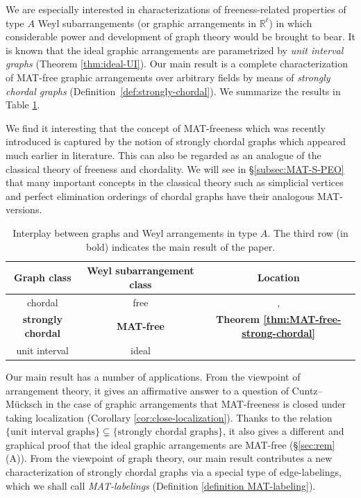 \documentclass[ALCO, Unicode,published]{cedram}
\newcommand{\R}{\mathbb{R}}
\begin{document}
We are especially interested in characterizations of freeness-related properties of type $A$ Weyl subarrangements (or graphic arrangements in $\R^\ell$) in which considerable power and development of graph theory would be brought to bear.
It is known that the ideal graphic arrangements are parametrized by \emph{unit interval graphs} \eg  \cite{TT21}
(\cf Theorem  \ref{thm:ideal-UI}). 
Our main result is a complete characterization of MAT-free graphic arrangements over arbitrary fields by means of  \emph{strongly chordal graphs} (\cf Definition~\ref{def:strongly-chordal}). 
We summarize the results in Table \ref{tab:concepts}. 

We find it interesting that the concept of MAT-freeness which was recently introduced is captured by the notion of strongly chordal graphs which appeared  much earlier in literature.
This can also be regarded as an analogue of the  classical theory of freeness and chordality. 
We will see in \S \ref{subsec:MAT-S-PEO} that many important concepts in the classical theory such as simplicial vertices and perfect elimination orderings of chordal graphs have their analogous MAT- versions. 
\begin{table}[htbp]
\centering
{\renewcommand\arraystretch{1.5} 
\begin{tabular}{c|c|c}
Graph class & Weyl subarrangement class & Location \\
\hline\hline
chordal  &  free   & \cite{St72}, {\cite[Theorem 3.3]{ER94}}\\
\hline
\textbf{strongly chordal} &   \textbf{MAT-free}  & \textbf{Theorem \ref{thm:MAT-free-strong-chordal}}\\
\hline
unit interval &  ideal & \eg  {\cite[Theorem 16]{TT21}}\\
\end{tabular}
}
\bigskip
\caption{Interplay between graphs and Weyl arrangements in type $A$. 
The third row (in bold) indicates the main result of the paper.}
\label{tab:concepts}
\end{table}

Our main result has a number of applications.
From the viewpoint of arrangement theory, it gives an affirmative answer to a question of Cuntz--M{\"u}cksch in the case of graphic arrangements  that MAT-freeness is closed under taking localization  (\cf Corollary \ref{cor:close-localization}). 
Thanks to the relation $\{\mbox{unit interval graphs}\} \subsetneq \{\mbox{strongly chordal graphs}\}$, it also gives a different and graphical proof that the ideal graphic arrangements are MAT-free (\cf \S\ref{sec:rem}(A)). 
From the viewpoint of graph theory, our main result contributes a new characterization of strongly chordal graphs via a special type of edge-labelings, which we shall call \emph{MAT-labelings} (\cf Definition \ref{definition MAT-labeling}). 
\end{document}
